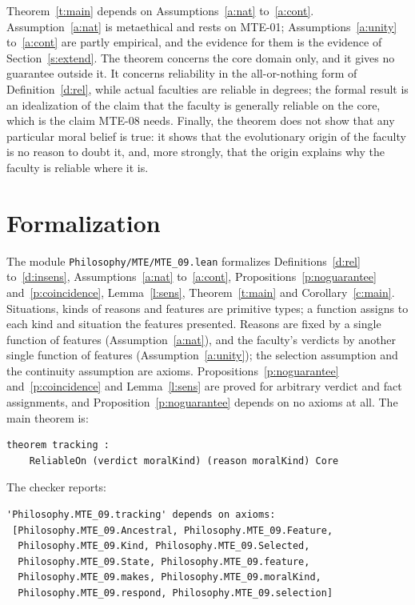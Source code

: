 \documentclass{situationist-preprint}
\begin{document}
Theorem~\ref{t:main} depends on Assumptions~\ref{a:nat} to~\ref{a:cont}. Assumption~\ref{a:nat} is metaethical and rests on MTE-01; Assumptions~\ref{a:unity} to~\ref{a:cont} are partly empirical, and the evidence for them is the evidence of Section~\ref{s:extend}. The theorem concerns the core domain only, and it gives no guarantee outside it. It concerns reliability in the all-or-nothing form of Definition~\ref{d:rel}, while actual faculties are reliable in degrees; the formal result is an idealization of the claim that the faculty is generally reliable on the core, which is the claim MTE-08 needs. Finally, the theorem does not show that any particular moral belief is true: it shows that the evolutionary origin of the faculty is no reason to doubt it, and, more strongly, that the origin explains why the faculty is reliable where it is.

\section{Formalization}

The module \nolinkurl{Philosophy/MTE/MTE_09.lean} formalizes Definitions~\ref{d:rel} to~\ref{d:insens}, Assumptions~\ref{a:nat} to~\ref{a:cont}, Propositions~\ref{p:noguarantee} and~\ref{p:coincidence}, Lemma~\ref{l:sens}, Theorem~\ref{t:main} and Corollary~\ref{c:main}. Situations, kinds of reasons and features are primitive types; a function assigns to each kind and situation the features presented. Reasons are fixed by a single function of features (Assumption~\ref{a:nat}), and the faculty's verdicts by another single function of features (Assumption~\ref{a:unity}); the selection assumption and the continuity assumption are axioms. Propositions~\ref{p:noguarantee} and~\ref{p:coincidence} and Lemma~\ref{l:sens} are proved for arbitrary verdict and fact assignments, and Proposition~\ref{p:noguarantee} depends on no axioms at all. The main theorem is:

\begin{lstlisting}[basicstyle=\ttfamily\footnotesize]
theorem tracking :
    ReliableOn (verdict moralKind) (reason moralKind) Core
\end{lstlisting}

\noindent The checker reports:

\begin{lstlisting}[basicstyle=\ttfamily\footnotesize]
'Philosophy.MTE_09.tracking' depends on axioms:
 [Philosophy.MTE_09.Ancestral, Philosophy.MTE_09.Feature,
  Philosophy.MTE_09.Kind, Philosophy.MTE_09.Selected,
  Philosophy.MTE_09.State, Philosophy.MTE_09.feature,
  Philosophy.MTE_09.makes, Philosophy.MTE_09.moralKind,
  Philosophy.MTE_09.respond, Philosophy.MTE_09.selection]
\end{lstlisting}
\end{document}
